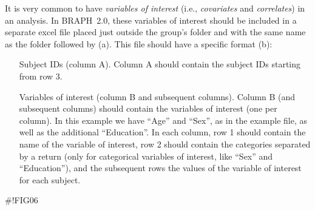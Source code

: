 \documentclass[justified]{tufte-handout}
\begin{document}
It is very common to have \emph{variables of interest} (i.e., \emph{covariates} and \emph{correlates}) in an analysis. In BRAPH~2.0, 
these variables of interest should be included in a separate excel file placed just outside the group's folder and with the same name as the folder followed by  (a). This file should have a specific format (b):
\begin{itemize}

\item[Subject IDs (column A).]
Column A should contain the subject IDs starting from row 3.

\item[Variables of interest (column B and subsequent columns).]
Column B (and subsequent columns) should contain the variables of interest (one per column). 
In this example we have ``Age'' and ``Sex'', as in the example file, as well as the additional ``Education''.
In each column, row 1 should contain the name of the variable of interest, row 2 should contain the categories separated by a return (only for categorical variables of interest, like ``Sex'' and ``Education''), and the subsequent rows the values of the variable of interest for each subject.

\end{itemize}	
#!FIG06
\end{document}
